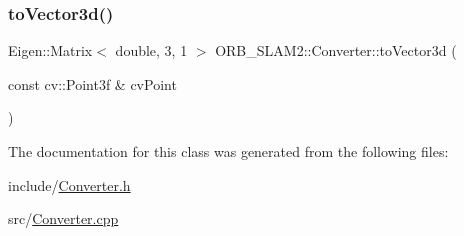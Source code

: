 \mbox{\label{class_o_r_b___s_l_a_m2_1_1_converter_af7b71b64b74fd45b39b9a7f47ee80145}} 
\subsubsection{\texorpdfstring{to\+Vector3d()}{toVector3d()}\hspace{0.1cm}{\footnotesize\ttfamily [2/2]}}
{\footnotesize\ttfamily Eigen\+::\+Matrix$<$ double, 3, 1 $>$ O\+R\+B\+\_\+\+S\+L\+A\+M2\+::\+Converter\+::to\+Vector3d (\begin{DoxyParamCaption}\item[{const cv\+::\+Point3f \&}]{cv\+Point }\end{DoxyParamCaption})\hspace{0.3cm}{\ttfamily [static]}}



The documentation for this class was generated from the following files\+:\begin{DoxyCompactItemize}
\item 
include/\mbox{\hyperlink{_converter_8h}{Converter.\+h}}\item 
src/\mbox{\hyperlink{_converter_8cpp}{Converter.\+cpp}}\end{DoxyCompactItemize}
